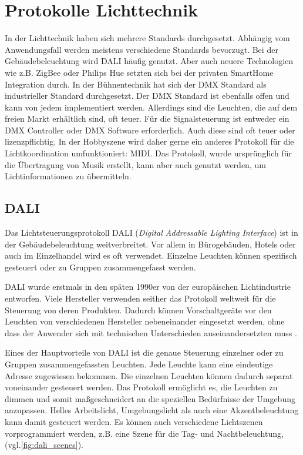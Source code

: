 \chapter{Protokolle Lichttechnik}

In der Lichttechnik haben sich mehrere Standards durchgesetzt. Abhängig vom Anwendungsfall werden meistens verschiedene Standards bevorzugt. Bei der Gebäudebeleuchtung wird DALI häufig genutzt. Aber auch neuere Technologien wie z.B. ZigBee oder Philips Hue setzten sich bei der privaten SmartHome Integration durch. In der Bühnentechnik hat sich der DMX Standard als industrieller Standard durchgesetzt. Der DMX Standard ist ebenfalls offen und kann von jedem implementiert werden. Allerdings sind die Leuchten, die auf dem freien Markt erhältlich sind, oft teuer.  Für die Signalsteuerung ist entweder ein DMX Controller oder DMX Software erforderlich. Auch diese sind oft teuer  oder lizenzpflichtig. In der Hobbyszene wird daher gerne ein anderes Protokoll für die Lichtkoordination umfunktioniert: MIDI. Das Protokoll, wurde ursprünglich für die Übertragung von Musik erstellt, kann aber auch genutzt werden, um Lichtinformationen zu übermitteln.


\section{DALI}
Das Lichtsteuerungsprotokoll DALI (\emph{Digital Addressable Lighting Interface}) ist in der Gebäudebeleuchtung weitverbreitet. Vor allem in Bürogebäuden, Hotels oder auch im Einzelhandel wird es oft verwendet. Einzelne Leuchten können spezifisch gesteuert oder zu Gruppen zusammengefasst werden.

DALI wurde erstmals in den späten 1990er \cite{DALI-2_certification} von der europäischen Lichtindustrie entworfen. Viele Hersteller verwenden seither das Protokoll weltweit für die Steuerung von deren Produkten. Dadurch können Vorschaltgeräte vor den Leuchten von verschiedenen Hersteller nebeneinander eingesetzt werden, ohne dass der Anwender sich mit technischen Unterschieden auseinandersetzten muss \cite[S.2, ch. 3.1]{DALI-Lichtmanagement}.

Eines der Hauptvorteile von DALI ist die genaue Steuerung einzelner oder zu Gruppen zusammengefassten Leuchten. Jede Leuchte kann eine eindeutige Adresse zugewiesen bekommen. Die einzelnen Leuchten können dadurch separat voneinander gesteuert werden. Das Protokoll ermöglicht es, die Leuchten zu dimmen und somit maßgeschneidert an die speziellen Bedürfnisse der Umgebung anzupassen. Helles Arbeitslicht, Umgebungslicht als auch eine Akzentbeleuchtung kann damit gesteuert werden. Es können auch verschiedene Lichtszenen vorprogrammiert werden, z.B. eine Szene für die Tag- und Nachtbeleuchtung, (vgl.\ref{fig:dali_scenes}).

